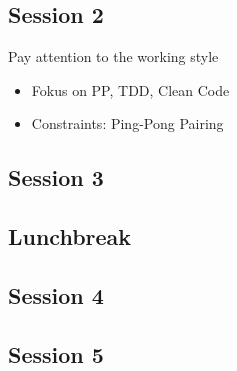 \documentclass[12pt, xcolor=table, dvipsnames]{beamer}
\begin{document}
\subsection{Session 2}
\begin{frame}[squeeze]{\subsecname{}}
	Pay attention to the working style
	\begin{itemize}
		\item Fokus on PP, TDD, Clean Code
		\item Constraints: Ping-Pong Pairing
	\end{itemize}
\end{frame}

\subsection{Session 3}
\begin{frame}[squeeze]{\subsecname{}}
\end{frame}

\subsection{Lunchbreak}
\begin{frame}[squeeze]{\subsecname{}}
\end{frame}

\subsection{Session 4}
\begin{frame}[squeeze]{\subsecname{}}
\end{frame}

\subsection{Session 5}


\end{document}
